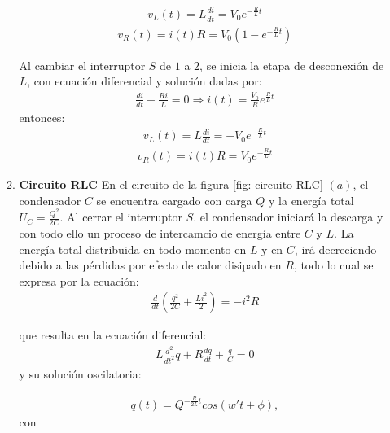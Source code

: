 \documentclass[]{article}
\begin{document}
\begin{enumerate}
\begin{enumerate}
            \begin{align*}
                  v_L(t) = L \frac{di}{dt} = V_0 e^{-\frac{R}{L}t}
            \end{align*}
            \begin{align*}
                  v_R(t) = i(t)R =  V_0 (1 - e^{-\frac{R}{L}t})
            \end{align*}
            
            Al cambiar el interruptor $S$ de $1$ a $2$, se inicia la etapa de desconexión de $L$, con ecuación diferencial y solución dadas por:
            \begin{align*}
                  \frac{di}{dt} + \frac{Ri}{L} = 0 \Rightarrow i(t) = \frac{V_0}{R} e^{\frac{R}{L}t} 
            \end{align*}
            entonces:
            \begin{align*}
                  v_L(t) = L \frac{di}{dt} = - V_0 e^{-\frac{R}{L}t}
            \end{align*}
            \begin{align*}
                  v_R(t) = i(t)R =  V_0 e^{-\frac{R}{L}t}
            \end{align*}

            \item \textbf{Circuito RLC}
            En el circuito de la figura \ref{fig: circuito-RLC} $(a)$, el condensador $C$ se encuentra cargado con carga $Q$ y la energía total
            $U_C = \frac{Q^2}{2C}$. Al cerrar el interruptor $S$. el condensador iniciará la descarga y con todo ello un proceso de 
            intercamcio de energía entre $C$ y $L$. La energía total distribuida en todo momento en $L$ y en $C$, irá decreciendo debido a 
            las pérdidas por efecto de calor disipado en $R$, todo lo cual se expresa por la ecuación:
            \begin{align*}
                  \frac{d}{dt}\left(\frac{q^2}{2C} + \frac{Li^2}{2}\right) = - i^2 R
            \end{align*} 

            que resulta en la ecuación diferencial:
            \begin{align*}
                  L \frac{d^2}{dt^2}q + R\frac{dq}{dt} + \frac{q}{C} = 0
            \end{align*}
            y su solución oscilatoria:

            \begin{align*}
                  q(t) = Q^{-\frac{R}{2L}t}cos(w't + \phi),
            \end{align*}
            con


\end{enumerate}
\end{enumerate}
\end{document}
